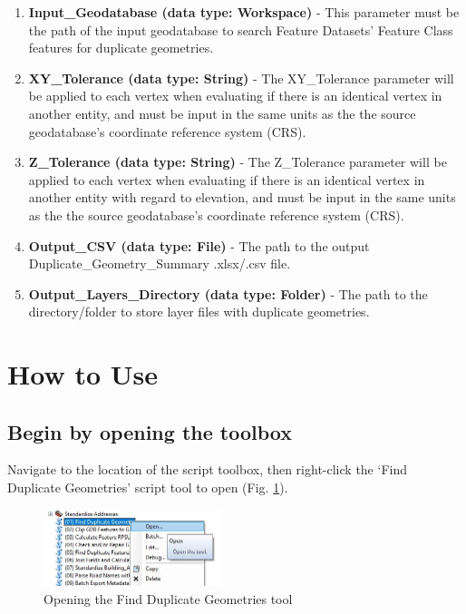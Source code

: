 \documentclass[openany]{book}
\providecommand{\tightlist}{%
  \setlength{\itemsep}{0pt}\setlength{\parskip}{0pt}}
\theoremstyle{definition}
\theoremstyle{definition}
\theoremstyle{definition}
\theoremstyle{remark}
\begin{document}
\begin{enumerate}
\def\labelenumi{\arabic{enumi}.}
\tightlist
\item
  \textbf{Input\_Geodatabase (data type: Workspace)} - This parameter
  must be the path of the input geodatabase to search Feature Datasets'
  Feature Class features for duplicate geometries.\\
\item
  \textbf{XY\_Tolerance (data type: String)} - The XY\_Tolerance
  parameter will be applied to each vertex when evaluating if there is
  an identical vertex in another entity, and must be input in the same
  units as the the source geodatabase's coordinate reference system
  (CRS).
\item
  \textbf{Z\_Tolerance (data type: String)} - The Z\_Tolerance parameter
  will be applied to each vertex when evaluating if there is an
  identical vertex in another entity with regard to elevation, and must
  be input in the same units as the the source geodatabase's coordinate
  reference system (CRS).
\item
  \textbf{Output\_CSV (data type: File)} - The path to the output
  Duplicate\_Geometry\_Summary .xlsx/.csv file.
\item
  \textbf{Output\_Layers\_Directory (data type: Folder)} - The path to
  the directory/folder to store layer files with duplicate geometries.
\end{enumerate}

\section{How to Use}\label{how-to-use-4}

\subsection{Begin by opening the
toolbox}\label{begin-by-opening-the-toolbox-4}

Navigate to the location of the script toolbox, then right-click the
`Find Duplicate Geometries' script tool to open (Fig.
\ref{fig:dupGopen}).

\begin{figure}[H]

{\centering \includegraphics[width=2.03in,]{figures/dupG-opentool} 

}

\caption{Opening the Find Duplicate Geometries tool}\label{fig:dupGopen}
\end{figure}
\end{document}
